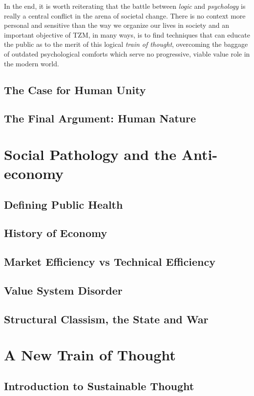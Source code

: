 \documentclass[10pt, a4paper, cleardoubleempty, openright, twoside]{book}
\begin{document}
In the end, it is worth reiterating that the battle between \emph{logic}
and \emph{psychology} is really a central conflict in the arena of
societal change. There is no context more personal and sensitive than
the way we organize our lives in society and an important objective of
TZM, in many ways, is to find techniques that can educate the public as
to the merit of this logical \emph{train of thought}, overcoming the
baggage of outdated psychological comforts which serve no progressive,
viable value role in the modern world. 


\chapter {The Case for Human Unity}
%
\chapter {The Final Argument: Human Nature}

\part {Social Pathology and the Anti-economy \label{part:anti-economy}}
\chapter {Defining Public Health}
\chapter {History of Economy}
\chapter {Market Efficiency vs Technical Efficiency}
\chapter {Value System Disorder}
\chapter {Structural Classism, the State and War}

\part {A New Train of Thought \label{part:trainOfThought}}
\chapter {Introduction to Sustainable Thought}
\end{document}

